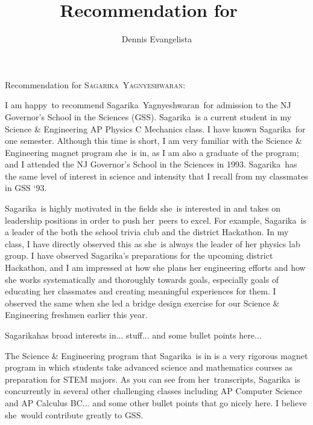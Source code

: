\documentclass[10pt]{letter}
\title{Recommendation for \firstname\ \lastname}
\author{Dennis Evangelista}
\date{}
\newcommand\firstname{Sagarika}
\newcommand\lastname{Yagnyeshwaran}
\newcommand\subject{she}
\newcommand\possessive{her}
\newcommand\adjective{happy}
\begin{document}
\begin{letter}{%
}

\opening{Recommendation for {\scshape\firstname\ \lastname}:}

I am \adjective\ to recommend \firstname\ \lastname\ for admission to the NJ Governor's School in the Sciences (GSS). \firstname\ is a current student in my Science \& Engineering AP Physics C Mechanics class. I have known \firstname\ for one semester. Although this time is short, I am very familiar with the Science \& Engineering magnet program \subject\ is in, as I am also a graduate of the program; and I attended the NJ Governor's School in the Sciences in 1993. \firstname\ has the same level of interest in science and intensity that I recall from my classmates in GSS `93. 

\firstname\ is highly motivated in the fields \subject\ is interested in and takes on leadership positions in order to push \possessive\ peers to excel. For example, \firstname\ is a leader of the both the school trivia club and the district Hackathon. In my class, I have directly observed this as \subject\ is always the leader of her physics lab group. I have observed \firstname's preparations for the upcoming district Hackathon, and I am impressed at how she plans her engineering efforts and how she works systematically and thoroughly towards goals, especially goals of educating her classmates and creating meaningful experiences for them. I observed the same when she led a bridge design exercise for our Science \& Engineering freshmen earlier this year. 

\firstname has broad interests in... stuff... and some bullet points here...

The Science \& Engineering program that \firstname\ is in is a very rigorous magnet program in which students take advanced science and mathematics courses as preparation for STEM majors. As you can see from \possessive\ transcripts, \firstname\ is concurrently in several other challenging classes including AP Computer Science and AP Calculus BC... and some other bullet points that go nicely here. I believe \subject\ would contribute greatly to GSS. 

\noclosing

\end{letter}
\end{document}
